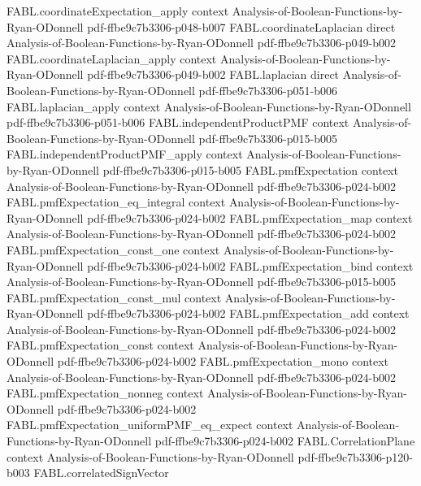 \begin{theorem}
  {FABL.coordinateExpectation_apply}
  {context}
  {Analysis-of-Boolean-Functions-by-Ryan-ODonnell}
  {pdf-ffbe9c7b3306-p048-b007}
\proofstep
  {FABL.coordinateLaplacian}
  {direct}
  {Analysis-of-Boolean-Functions-by-Ryan-ODonnell}
  {pdf-ffbe9c7b3306-p049-b002}
\proofstep
  {FABL.coordinateLaplacian_apply}
  {context}
  {Analysis-of-Boolean-Functions-by-Ryan-ODonnell}
  {pdf-ffbe9c7b3306-p049-b002}
\proofstep
  {FABL.laplacian}
  {direct}
  {Analysis-of-Boolean-Functions-by-Ryan-ODonnell}
  {pdf-ffbe9c7b3306-p051-b006}
\proofstep
  {FABL.laplacian_apply}
  {context}
  {Analysis-of-Boolean-Functions-by-Ryan-ODonnell}
  {pdf-ffbe9c7b3306-p051-b006}
\proofstep
  {FABL.independentProductPMF}
  {context}
  {Analysis-of-Boolean-Functions-by-Ryan-ODonnell}
  {pdf-ffbe9c7b3306-p015-b005}
\proofstep
  {FABL.independentProductPMF_apply}
  {context}
  {Analysis-of-Boolean-Functions-by-Ryan-ODonnell}
  {pdf-ffbe9c7b3306-p015-b005}
\proofstep
  {FABL.pmfExpectation}
  {context}
  {Analysis-of-Boolean-Functions-by-Ryan-ODonnell}
  {pdf-ffbe9c7b3306-p024-b002}
\proofstep
  {FABL.pmfExpectation_eq_integral}
  {context}
  {Analysis-of-Boolean-Functions-by-Ryan-ODonnell}
  {pdf-ffbe9c7b3306-p024-b002}
\proofstep
  {FABL.pmfExpectation_map}
  {context}
  {Analysis-of-Boolean-Functions-by-Ryan-ODonnell}
  {pdf-ffbe9c7b3306-p024-b002}
\proofstep
  {FABL.pmfExpectation_const_one}
  {context}
  {Analysis-of-Boolean-Functions-by-Ryan-ODonnell}
  {pdf-ffbe9c7b3306-p024-b002}
\proofstep
  {FABL.pmfExpectation_bind}
  {context}
  {Analysis-of-Boolean-Functions-by-Ryan-ODonnell}
  {pdf-ffbe9c7b3306-p015-b005}
\proofstep
  {FABL.pmfExpectation_const_mul}
  {context}
  {Analysis-of-Boolean-Functions-by-Ryan-ODonnell}
  {pdf-ffbe9c7b3306-p024-b002}
\proofstep
  {FABL.pmfExpectation_add}
  {context}
  {Analysis-of-Boolean-Functions-by-Ryan-ODonnell}
  {pdf-ffbe9c7b3306-p024-b002}
\proofstep
  {FABL.pmfExpectation_const}
  {context}
  {Analysis-of-Boolean-Functions-by-Ryan-ODonnell}
  {pdf-ffbe9c7b3306-p024-b002}
\proofstep
  {FABL.pmfExpectation_mono}
  {context}
  {Analysis-of-Boolean-Functions-by-Ryan-ODonnell}
  {pdf-ffbe9c7b3306-p024-b002}
\proofstep
  {FABL.pmfExpectation_nonneg}
  {context}
  {Analysis-of-Boolean-Functions-by-Ryan-ODonnell}
  {pdf-ffbe9c7b3306-p024-b002}
\proofstep
  {FABL.pmfExpectation_uniformPMF_eq_expect}
  {context}
  {Analysis-of-Boolean-Functions-by-Ryan-ODonnell}
  {pdf-ffbe9c7b3306-p024-b002}
\proofstep
  {FABL.CorrelationPlane}
  {context}
  {Analysis-of-Boolean-Functions-by-Ryan-ODonnell}
  {pdf-ffbe9c7b3306-p120-b003}
\proofstep
  {FABL.correlatedSignVector}

\end{theorem}
